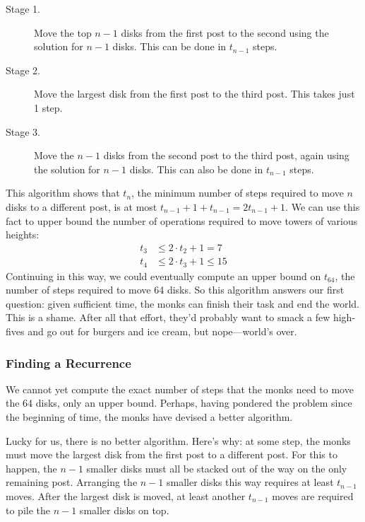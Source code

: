 \begin{description}

\item[Stage 1.]  Move the top $n-1$ disks from the first post to
  the second using the solution for $n - 1$ disks.  This can be done
  in $t_{n-1}$ steps.

\item[Stage 2.]  Move the largest disk from the first post to the
  third post.  This takes just 1 step.

\item[Stage 3.]  Move the $n-1$ disks from the second post to
  the third post, again using the solution for $n - 1$ disks.  This
  can also be done in $t_{n-1}$ steps.

\end{description}

This algorithm shows that $t_n$, the minimum number of steps required
to move $n$ disks to a different post, is at most $t_{n-1} + 1 +
t_{n-1} = 2 t_{n-1} + 1$.  We can use this fact to upper bound the
number of operations required to move towers of various heights:
\begin{align*}
t_3 & \leq 2 \cdot t_2 + 1 = 7 \\
t_4 & \leq 2 \cdot t_3 + 1 \leq 15
\end{align*}
Continuing in this way, we could eventually compute an upper bound on
$t_{64}$, the number of steps required to move 64 disks.  So this
algorithm answers our first question: given sufficient time, the monks
can finish their task and end the world.  This is a shame.  After all
that effort, they'd probably want to smack a few high-fives and go out
for burgers and ice cream, but nope---world's over.

\subsubsection{Finding a Recurrence}
We cannot yet compute the exact number of steps that the monks need
to move the 64 disks, only an upper bound.  Perhaps, having pondered
the problem since the beginning of time, the monks have devised a
better algorithm.

Lucky for us, there is no better algorithm. Here's why: at some step,
the monks must move the largest disk from the first post to a
different post.  For this to happen, the $n - 1$ smaller disks must all
be stacked out of the way on the only remaining post.  Arranging the $n
- 1$ smaller disks this way requires at least $t_{n-1}$ moves.  After
the largest disk is moved, at least another $t_{n-1}$ moves are
required to pile the $n - 1$ smaller disks on top.

